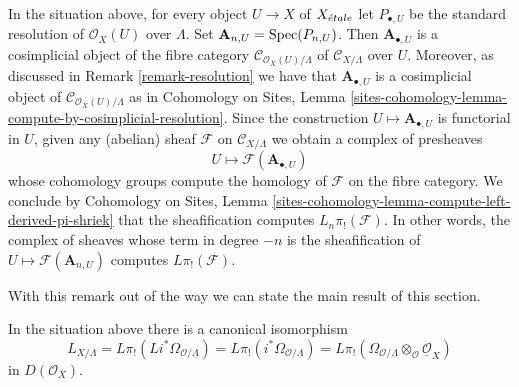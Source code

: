 \begin{remark}
\label{remark-compute-L-pi-shriek-spaces}
In the situation above, for every object $U \to X$ of $X_{\acute{e}tale}$
let $P_{\bullet, U}$ be the standard resolution of $\mathcal{O}_X(U)$
over $\Lambda$. Set $\mathbf{A}_{n, U} = \mathop{\mathrm{Spec}}(P_{n, U})$.
Then $\mathbf{A}_{\bullet, U}$
is a cosimplicial object of the fibre category
$\mathcal{C}_{\mathcal{O}_X(U)/\Lambda}$ of
$\mathcal{C}_{X/\Lambda}$ over $U$. Moreover, as discussed
in Remark \ref{remark-resolution} we have that $\mathbf{A}_{\bullet, U}$
is a cosimplicial object of $\mathcal{C}_{\mathcal{O}_X(U)/\Lambda}$
as in Cohomology on Sites, Lemma
\ref{sites-cohomology-lemma-compute-by-cosimplicial-resolution}.
Since the construction $U \mapsto \mathbf{A}_{\bullet, U}$ is functorial
in $U$, given any (abelian) sheaf $\mathcal{F}$ on $\mathcal{C}_{X/\Lambda}$
we obtain a complex of presheaves
$$
U \longmapsto \mathcal{F}(\mathbf{A}_{\bullet, U})
$$
whose cohomology groups compute the homology of $\mathcal{F}$ on the fibre
category. We conclude by
Cohomology on Sites, Lemma
\ref{sites-cohomology-lemma-compute-left-derived-pi-shriek}
that the sheafification computes $L_n\pi_!(\mathcal{F})$.
In other words, the complex of sheaves whose term in degree $-n$ is
the sheafification of $U \mapsto \mathcal{F}(\mathbf{A}_{n, U})$ computes
$L\pi_!(\mathcal{F})$.
\end{remark}

\noindent
With this remark out of the way we can state the main
result of this section.

\begin{lemma}
\label{lemma-cotangent-morphism-spaces}
In the situation above there is a canonical isomorphism
$$
L_{X/\Lambda} = 
L\pi_!(Li^*\Omega_{\mathcal{O}/\underline{\Lambda}}) =
L\pi_!(i^*\Omega_{\mathcal{O}/\underline{\Lambda}}) =
L\pi_!(\Omega_{\mathcal{O}/\underline{\Lambda}}
\otimes_\mathcal{O} \underline{\mathcal{O}}_X)
$$
in $D(\mathcal{O}_X)$.
\end{lemma}

